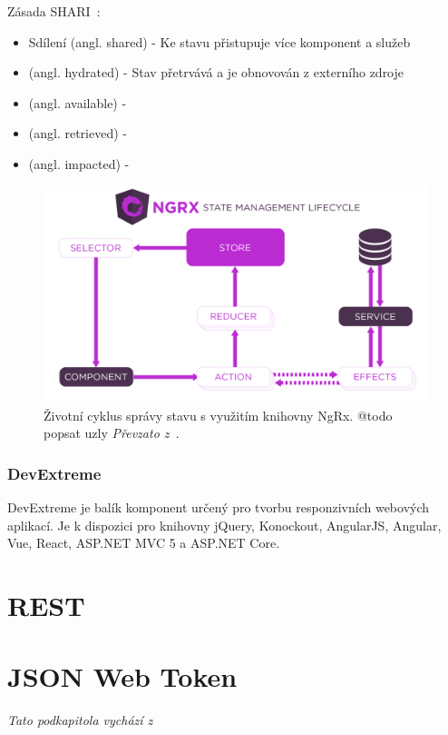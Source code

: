 Zásada SHARI~\cite{biib:ng-conf}:
\begin{itemize}
  \item Sdílení (angl. shared) - Ke stavu přistupuje více komponent a služeb
  \item (angl. hydrated) - Stav přetrvává a je obnovován z externího zdroje
  \item (angl. available) - 
  \item (angl. retrieved) - 
  \item (angl. impacted) - 
\end{itemize}

\blindtext
\begin{figure}[H]
	\centering
	\includegraphics[width=\textwidth]{obrazky-figures/ngrx-lifecycle.png}
	\caption{Životní cyklus správy stavu s využitím knihovny NgRx. @todo popsat uzly \emph{Převzato z~\cite{bib:ngrx-lifecycle}}.}
\end{figure}
\blindtext

\subsubsection{DevExtreme}
DevExtreme je balík komponent určený pro tvorbu responzivních webových aplikací. Je k dispozici pro knihovny jQuery, Konockout, AngularJS, Angular, Vue, React, ASP.NET MVC 5 a ASP.NET Core.  
\blindtext

\section{REST}
\blindtext[2]

\section{JSON Web Token}
\emph{Tato podkapitola vychází z~\cite{bib:jwt}}

